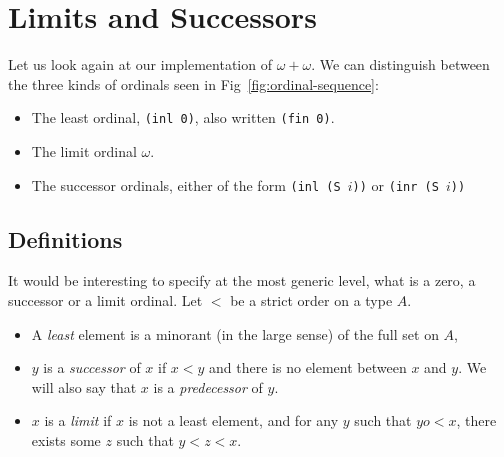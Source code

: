 \documentclass[a4paper]{book}
\begin{document}
  




%

\section{Limits and Successors}

Let us look again at our implementation of $\omega+\omega$. We can distinguish between the three kinds of ordinals seen in Fig~\ref{fig:ordinal-sequence}:

\begin{itemize}
\item The least ordinal, \texttt{(inl 0)}, also written \texttt{(fin 0)}.
\item The limit ordinal $\omega$.
\item The successor ordinals, either of the form \texttt{(inl (S $i$))} or \texttt{(inr (S $i$))}
\end{itemize}

\subsection{Definitions}
It would be interesting to specify at the most generic level, what is a zero, a successor or a limit ordinal. Let $<$ be a strict order on a type $A$.

\begin{itemize}
\item A \emph{least} element is a minorant (in the large sense) of the full set  on $A$,
\item $y$ is a \emph{successor} of $x$ if $x<y$ and there is no element between $x$ and $y$. We will also say that $x$ is a \emph{predecessor} of $y$.
\item $x$ is a \emph{limit} if $x$ is not a least element, and for any $y$ such that $yo<x$,
 there exists some $z$ such that $y<z<x$.
\end{itemize}
\end{document}
